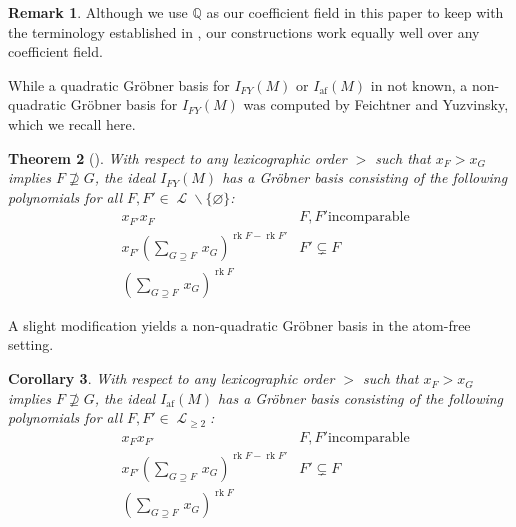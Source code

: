 \documentclass[11pt, reqno]{amsart}
\DeclareMathOperator{\atomfree}{af}
\newcommand{\af}{{\atomfree}}
\renewcommand{\emptyset}{\varnothing}
\DeclareMathOperator{\LL}{\mathcal{L}}
\newcommand{\QQ}{\mathbb{Q}}
\DeclareMathOperator{\rk}{rk}
\renewcommand{\setminus}{\smallsetminus}
\newtheorem{thm}{Theorem}[section]
\newtheorem{cor}[thm]{Corollary}
\theoremstyle{definition}
\newtheorem{rmk}[thm]{Remark}
\numberwithin{equation}{section}
\numberwithin{table}{section}
\begin{document}
\begin{spacing}{1.1}
\begin{rmk}
Although we use $\QQ$ as our coefficient field in this paper to keep with the terminology established in \cite{BHMPW20b}, our constructions work equally well over any coefficient field.
\end{rmk}


While a quadratic Gr\"obner basis for $I_{FY}(M)$ or $I_{\af}(M)$ in not known, a non-quadratic Gr\"obner basis for $I_{FY}(M)$ was computed by Feichtner and Yuzvinsky, which we recall here.

\begin{thm}[{\cite[Theorem 2]{FY04}}]\label{FYgb}
With respect to any lexicographic order $>$ such that $x_F > x_G$ implies $F \nsupseteq G$, the ideal $I_{FY}(M)$ has a Gr\"obner basis consisting of the following polynomials for all $F, F' \in \LL \setminus \{\emptyset\}$:
\begin{align} 
&x_{F'}x_F& F, F' \text{incomparable} \\
&x_{F'}\left(\textstyle \sum_{G \supseteq F}\, x_G\right)^{\rk F - \rk F'}& F' \subsetneq F \\
&\left(\textstyle \sum_{G \supseteq F}\, x_G\right)^{\rk F} 
\end{align}
\end{thm}

A slight modification yields a non-quadratic Gr\"obner basis in the atom-free setting.

\begin{cor} \label{atom-free:Gröbner:basis}
With respect to any lexicographic order $>$ such that $x_F > x_G$ implies $F \nsupseteq G$, the ideal $I_{\mathrm{af}}(M)$ has a Gr\"obner basis consisting of the following polynomials for all $F, F' \in \LL_{\geq 2}$:
\begin{align} 
&x_Fx_{F'}& F, F' \text{incomparable} \\
&x_{F'}\left(\textstyle \sum_{G \supseteq F}\,  x_G\right)^{\rk F - \rk F'}& F' \subsetneq F \\
&\left(\textstyle \sum_{G \supseteq F}\,  x_G\right)^{\rk F} & 
\end{align}
\end{cor}


\end{spacing}
\end{document}
